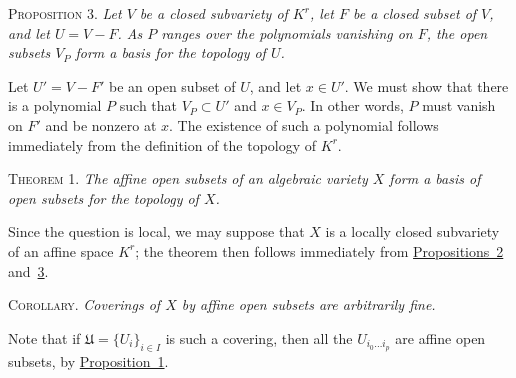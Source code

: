 \label{fac:II:3:no:42:prop:3}
\textsc{Proposition 3.} \textit{Let $V$ be a closed subvariety of $K^r$, let $F$ be a closed subset of $V$, and let $U=V-F$. As $P$ ranges over the polynomials vanishing on $F$, the open subsets $V_P$ form a basis for the topology of $U$.}

Let $U'=V-F'$ be an open subset of $U$, and let $x\in U'$. We must show that there is a polynomial $P$ such that $V_P\subset U'$ and $x\in V_P$. In other words, $P$ must vanish on $F'$ and be nonzero at $x$. The existence of such a polynomial follows immediately from the definition of the topology of $K^r$.

\label{fac:II:3:no:42:thm:1}
\textsc{Theorem 1.} \textit{The affine open subsets of an algebraic variety $X$ form a basis of open subsets for the topology of $X$.}

Since the question is local, we may suppose that $X$ is a locally closed subvariety of an affine space $K^r$; the theorem then follows immediately from \hyperref[fac:II:3:no:42:prop:2]{Propositions~2} and~\hyperref[fac:II:3:no:42:prop:3]{3}.

\label{fac:II:3:no:42:thm:1:cor}
\textsc{Corollary.} \textit{Coverings of $X$ by affine open subsets are arbitrarily fine.}

Note that if $\mathfrak{U}=\{U_i\}_{i\in I}$ is such a covering, then all the $U_{i_0\ldots i_p}$ are affine open subsets, by \hyperref[fac:II:3:no:42:prop:1]{Proposition~1}.
